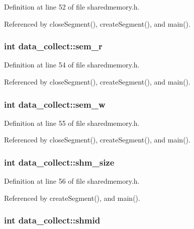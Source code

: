 Definition at line 52 of file sharedmemory.h.

Referenced by closeSegment(), createSegment(), and main().\hypertarget{structdata__collect_adf7aaf5ee36dd36fdda6ae9fc9a4068e}{
\subsubsection[{sem\_\-r}]{\setlength{\rightskip}{0pt plus 5cm}int {\bf data\_\-collect::sem\_\-r}}}
\label{structdata__collect_adf7aaf5ee36dd36fdda6ae9fc9a4068e}


Definition at line 54 of file sharedmemory.h.

Referenced by closeSegment(), createSegment(), and main().\hypertarget{structdata__collect_a4fa57f99fac53299a12129b6569e508a}{
\subsubsection[{sem\_\-w}]{\setlength{\rightskip}{0pt plus 5cm}int {\bf data\_\-collect::sem\_\-w}}}
\label{structdata__collect_a4fa57f99fac53299a12129b6569e508a}


Definition at line 55 of file sharedmemory.h.

Referenced by closeSegment(), createSegment(), and main().\hypertarget{structdata__collect_a7ff133294b7f36791b5fba644eeb65f0}{
\subsubsection[{shm\_\-size}]{\setlength{\rightskip}{0pt plus 5cm}int {\bf data\_\-collect::shm\_\-size}}}
\label{structdata__collect_a7ff133294b7f36791b5fba644eeb65f0}


Definition at line 56 of file sharedmemory.h.

Referenced by createSegment(), and main().\hypertarget{structdata__collect_ac9abcd6eaee07775c435580ec3a9fca8}{
\subsubsection[{shmid}]{\setlength{\rightskip}{0pt plus 5cm}int {\bf data\_\-collect::shmid}}}
\label{structdata__collect_ac9abcd6eaee07775c435580ec3a9fca8}


